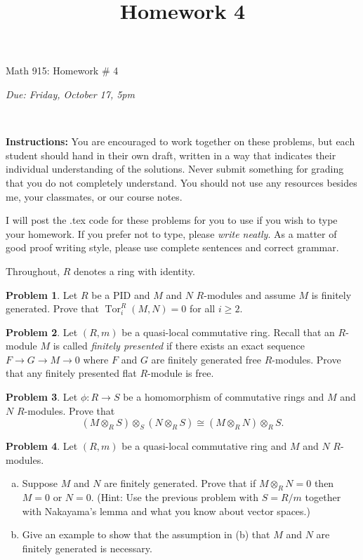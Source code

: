 \documentclass[11pt]{article}
\title{}
\date{\vspace{-0.5in}}
\title{Homework 4}
\theoremstyle{definition}
\newtheorem{problem}{Problem}
\newcommand{\Tor}{\operatorname{Tor}}
\begin{document}
\vspace{3em}

\begin{center}
	{\LARGE Math 915: Homework \# 4}
\end{center}
\begin{center}
{\it Due:  Friday, October 17, 5pm}
\end{center}

\

\noindent
{\bf Instructions:}
You are encouraged to work together on these problems, but each student should hand in their own draft, written in a way that indicates their individual understanding of the solutions. Never submit something for grading that you do not completely understand. You should not use any resources besides me, your classmates, or our course notes.

\medskip
\noindent
I will post the .tex code for these problems for you to use if you wish to type your homework. If you prefer not to type, please  {\em write neatly}. As a matter of good proof writing style, please use complete sentences and correct grammar. 


\medskip
\noindent
Throughout, $R$ denotes a ring with identity.

\medskip


\begin{problem} Let $R$ be a PID and $M$ and $N$ $R$-modules and assume $M$ is finitely generated.  Prove that $\Tor_i^R(M,N)=0$ for all $i\ge 2$.
\end{problem}

\begin{problem} Let $(R,m)$ be a quasi-local commutative ring. Recall that an $R$-module $M$ is called {\it finitely presented} if there exists an exact sequence $F\to G\to M\to 0$ where $F$ and $G$ are finitely generated free $R$-modules.   Prove that any finitely presented flat $R$-module is free.
\end{problem}

\begin{problem} Let $\phi:R\to S$ be a homomorphism of commutative rings and $M$ and $N$ $R$-modules.
Prove that 
$$(M\otimes_R S)\otimes_{S} (N\otimes_R S)\cong (M\otimes_R N)\otimes_R S.$$
\end{problem}

\begin{problem} Let $(R,m)$ be a quasi-local commutative ring and $M$ and $N$ $R$-modules. 
\begin{enumerate}[(a)]
\item Suppose $M$ and $N$ are finitely generated.  Prove that if $M\otimes_R N=0$ then $M=0$ or $N=0$. (Hint:  Use the previous problem with $S=R/m$ together with Nakayama's lemma and what you know about vector spaces.)
\item Give an example to show that the assumption in (b) that $M$ and $N$ are finitely generated is necessary.
\end{enumerate}
\end{problem}
\end{document}

